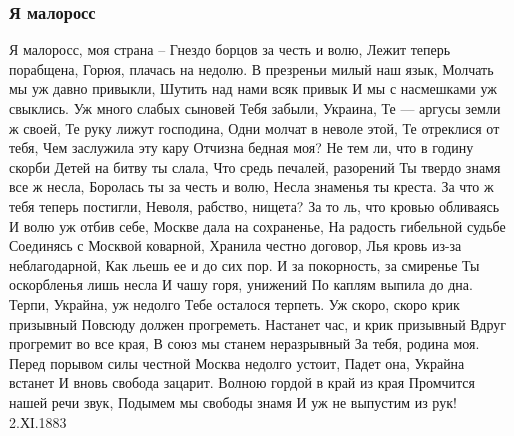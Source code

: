  
 
 

\subsubsection{Я малоросс}
\label{sec:poetry.rus.mihailo_grushevskii.ja_maloross}

Я малоросс, моя страна –
Гнездо борцов за честь и волю,
Лежит теперь порабщена,
Горюя, плачась на недолю.
В презреньи милый наш язык,
Молчать мы уж давно привыкли,
Шутить над нами всяк привык
И мы с насмешками уж свыклись.
Уж много слабых сыновей
Тебя забыли, Украина,
Те --- аргусы земли ж своей,
Те руку лижут господина,
Одни молчат в неволе этой,
Те отреклися от тебя,
Чем заслужила эту кару
Отчизна бедная моя?
Не тем ли, что в годину скорби
Детей на битву ты слала,
Что средь печалей, разорений
Ты твердо знамя все ж несла,
Боролась ты за честь и волю,
Несла знаменья ты креста.
За что ж тебя теперь постигли,
Неволя, рабство, нищета?
За то ль, что кровью обливаясь
И волю уж отбив себе,
Москве дала на сохраненье,
На радость гибельной судьбе
Соединясь с Москвой коварной,
Хранила честно договор,
Лья кровь из-за неблагодарной,
Как льешь ее и до сих пор.
И за покорность, за смиренье
Ты оскорбленья лишь несла
И чашу горя, унижений
По каплям выпила до дна.
Терпи, Украйна, уж недолго
Тебе осталося терпеть.
Уж скоро, скоро крик призывный
Повсюду должен прогреметь.
Настанет час, и крик призывный
Вдруг прогремит во все края,
В союз мы станем неразрывный
За тебя, родина моя.
Перед порывом силы честной
Москва недолго устоит,
Падет она, Украйна встанет
И вновь свобода зацарит.
Волною гордой в край из края
Промчится нашей речи звук,
Подымем мы свободы знамя
И уж не выпустим из рук!
2.ХІ.1883 
